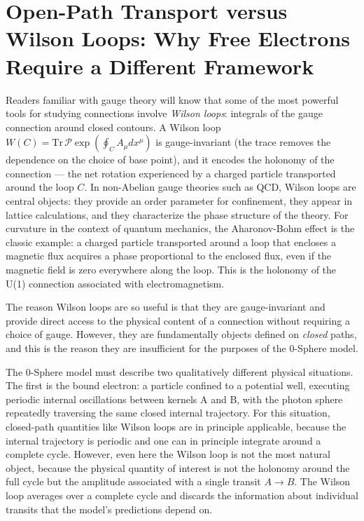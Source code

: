 \documentclass[%
 reprint,
 amsmath,amssymb,
 aps,
 prb,
]{revtex4-2}
\numberwithin{equation}{section}
\begin{document}
\section{Open-Path Transport versus Wilson Loops: Why Free Electrons Require a Different Framework}
\label{app:openpath}

Readers familiar with gauge theory will know that some of the most powerful tools for studying connections involve \emph{Wilson loops}: integrals of the gauge connection around closed contours. A Wilson loop $W(C) = \mathrm{Tr}\,\mathcal{P}\exp\!\left(\oint_C A_\mu dx^\mu\right)$ is gauge-invariant (the trace removes the dependence on the choice of base point), and it encodes the holonomy of the connection --- the net rotation experienced by a charged particle transported around the loop $C$. In non-Abelian gauge theories such as QCD, Wilson loops are central objects: they provide an order parameter for confinement, they appear in lattice calculations, and they characterize the phase structure of the theory. For curvature in the context of quantum mechanics, the Aharonov-Bohm effect is the classic example: a charged particle transported around a loop that encloses a magnetic flux acquires a phase proportional to the enclosed flux, even if the magnetic field is zero everywhere along the loop. This is the holonomy of the U(1) connection associated with electromagnetism.

The reason Wilson loops are so useful is that they are gauge-invariant and provide direct access to the physical content of a connection without requiring a choice of gauge. However, they are fundamentally objects defined on \emph{closed} paths, and this is the reason they are insufficient for the purposes of the 0-Sphere model.

The 0-Sphere model must describe two qualitatively different physical situations. The first is the bound electron: a particle confined to a potential well, executing periodic internal oscillations between kernels A and B, with the photon sphere repeatedly traversing the same closed internal trajectory. For this situation, closed-path quantities like Wilson loops are in principle applicable, because the internal trajectory is periodic and one can in principle integrate around a complete cycle. However, even here the Wilson loop is not the most natural object, because the physical quantity of interest is not the holonomy around the full cycle but the amplitude associated with a single transit $A\to B$. The Wilson loop averages over a complete cycle and discards the information about individual transits that the model's predictions depend on.
\end{document}
